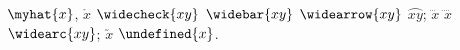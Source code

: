 \documentclass{article}
\let\overleftrightarrow\undefined %
\begin{document}
$\myhat{x}$, $\ring{x}$ $\widecheck{xy}$ $\widebar{xy}$ $\widearrow{xy}$ $\wideparen{xy}$;
$\dddot{x}$ $\ddddot{x}$ $\widearc{xy}$; $\utilde{x}$ $\overleftrightarrow{x}$.
\end{document}
